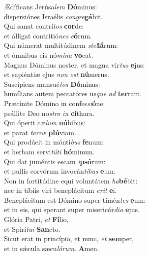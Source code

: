 \evenverse Ædíficans Jerúsa\textit{lem} \textbf{Dó}minus:~\*\\
\evenverse dispersiónes Israélis \textit{con}\textit{gre}\textbf{gá}bit.\\
\oddverse Qui sanat contrí\textit{tos} \textbf{cor}de:~\*\\
\oddverse et álligat contritió\textit{nes} \textit{e}\textbf{ó}rum.\\
\evenverse Qui númerat multitúdinem \textit{stel}\textbf{lá}rum:~\*\\
\evenverse et ómnibus eis nó\textit{mi}\textit{na} \textbf{vo}cat.\\
\oddverse Magnus Dóminus noster, et magna vir\textit{tus} \textbf{e}jus:~\*\\
\oddverse et sapiéntiæ ejus \textit{non} \textit{est} \textbf{nú}merus.\\
\evenverse Suscípiens mansué\textit{tos} \textbf{Dó}minus:~\*\\
\evenverse humílians autem peccatóres us\textit{que} \textit{ad} \textbf{ter}ram.\\
\oddverse Præcínite Dómino in confes\textit{si}\textbf{ó}ne:~\*\\
\oddverse psállite Deo no\textit{stro} \textit{in} \textbf{cí}thara.\\
\evenverse Qui óperit cæ\textit{lum} \textbf{nú}bibus:~\*\\
\evenverse et parat \textit{ter}\textit{ræ} \textbf{plú}viam.\\
\oddverse Qui prodúcit in mónti\textit{bus} \textbf{fe}num:~\*\\
\oddverse et herbam servi\textit{tú}\textit{ti} \textbf{hó}minum.\\
\evenverse Qui dat juméntis escam \textit{i}\textbf{psó}rum:~\*\\
\evenverse et pullis corvórum invocán\textit{ti}\textit{bus} \textbf{e}um.\\
\oddverse Non in fortitúdine equi voluntátem \textit{ha}\textbf{bé}bit:~\*\\
\oddverse nec in tíbiis viri beneplácitum \textit{e}\textit{rit} \textbf{e}i.\\
\evenverse Beneplácitum est Dómino super timén\textit{tes} \textbf{e}um:~\*\\
\evenverse et in eis, qui sperant super misericór\textit{di}\textit{a} \textbf{e}jus.\\
\oddverse Glória Patri, \textit{et} \textbf{Fí}lio,~\*\\
\oddverse et Spirí\textit{tu}\textit{i} \textbf{San}cto.\\
\evenverse Sicut erat in princípio, et nunc, \textit{et} \textbf{sem}per,~\*\\
\evenverse et in sǽcula sæcu\textit{ló}\textit{rum}. \textbf{A}men.\\
